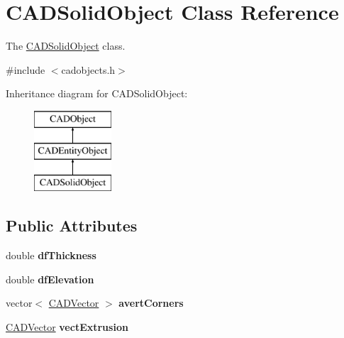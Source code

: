 \hypertarget{class_c_a_d_solid_object}{}\section{C\+A\+D\+Solid\+Object Class Reference}
\label{class_c_a_d_solid_object}


The \hyperlink{class_c_a_d_solid_object}{C\+A\+D\+Solid\+Object} class.  




{\ttfamily \#include $<$cadobjects.\+h$>$}

Inheritance diagram for C\+A\+D\+Solid\+Object\+:\begin{figure}[H]
\begin{center}
\leavevmode
\includegraphics[height=3.000000cm]{class_c_a_d_solid_object}
\end{center}
\end{figure}
\subsection*{Public Attributes}
\begin{DoxyCompactItemize}
\item 
double {\bfseries df\+Thickness}\hypertarget{class_c_a_d_solid_object_a66f6577cacff0ea3db3b46bcb380c599}{}\label{class_c_a_d_solid_object_a66f6577cacff0ea3db3b46bcb380c599}

\item 
double {\bfseries df\+Elevation}\hypertarget{class_c_a_d_solid_object_a79d4689ae6c78046c69e9dccfa5af79d}{}\label{class_c_a_d_solid_object_a79d4689ae6c78046c69e9dccfa5af79d}

\item 
vector$<$ \hyperlink{class_c_a_d_vector}{C\+A\+D\+Vector} $>$ {\bfseries avert\+Corners}\hypertarget{class_c_a_d_solid_object_a85322a41ca661db4b14250ebcca7e9a7}{}\label{class_c_a_d_solid_object_a85322a41ca661db4b14250ebcca7e9a7}

\item 
\hyperlink{class_c_a_d_vector}{C\+A\+D\+Vector} {\bfseries vect\+Extrusion}\hypertarget{class_c_a_d_solid_object_ae0519aa192705c40c7df0f2027bfc5f9}{}\label{class_c_a_d_solid_object_ae0519aa192705c40c7df0f2027bfc5f9}

\end{DoxyCompactItemize}
